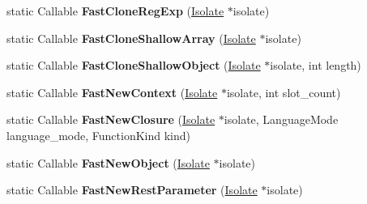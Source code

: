 \begin{DoxyCompactItemize}
\item 
static Callable {\bfseries Fast\+Clone\+Reg\+Exp} (\hyperlink{classv8_1_1internal_1_1_isolate}{Isolate} $\ast$isolate)\hypertarget{classv8_1_1internal_1_1_code_factory_abb0f3b75868ab982ca38a454ef3c063e}{}\label{classv8_1_1internal_1_1_code_factory_abb0f3b75868ab982ca38a454ef3c063e}

\item 
static Callable {\bfseries Fast\+Clone\+Shallow\+Array} (\hyperlink{classv8_1_1internal_1_1_isolate}{Isolate} $\ast$isolate)\hypertarget{classv8_1_1internal_1_1_code_factory_acde8fe33e3e1253ef8acead38d71269f}{}\label{classv8_1_1internal_1_1_code_factory_acde8fe33e3e1253ef8acead38d71269f}

\item 
static Callable {\bfseries Fast\+Clone\+Shallow\+Object} (\hyperlink{classv8_1_1internal_1_1_isolate}{Isolate} $\ast$isolate, int length)\hypertarget{classv8_1_1internal_1_1_code_factory_a516d9a31eea79d55426795e2956b748c}{}\label{classv8_1_1internal_1_1_code_factory_a516d9a31eea79d55426795e2956b748c}

\item 
static Callable {\bfseries Fast\+New\+Context} (\hyperlink{classv8_1_1internal_1_1_isolate}{Isolate} $\ast$isolate, int slot\+\_\+count)\hypertarget{classv8_1_1internal_1_1_code_factory_af67b1ab39ea507be8f6116774e2a3b2d}{}\label{classv8_1_1internal_1_1_code_factory_af67b1ab39ea507be8f6116774e2a3b2d}

\item 
static Callable {\bfseries Fast\+New\+Closure} (\hyperlink{classv8_1_1internal_1_1_isolate}{Isolate} $\ast$isolate, Language\+Mode language\+\_\+mode, Function\+Kind kind)\hypertarget{classv8_1_1internal_1_1_code_factory_a07c5cb0a438a9be9fbb55a0056fc74b1}{}\label{classv8_1_1internal_1_1_code_factory_a07c5cb0a438a9be9fbb55a0056fc74b1}

\item 
static Callable {\bfseries Fast\+New\+Object} (\hyperlink{classv8_1_1internal_1_1_isolate}{Isolate} $\ast$isolate)\hypertarget{classv8_1_1internal_1_1_code_factory_a0495ae221c4228938c778ae37b8711a0}{}\label{classv8_1_1internal_1_1_code_factory_a0495ae221c4228938c778ae37b8711a0}

\item 
static Callable {\bfseries Fast\+New\+Rest\+Parameter} (\hyperlink{classv8_1_1internal_1_1_isolate}{Isolate} $\ast$isolate)\hypertarget{classv8_1_1internal_1_1_code_factory_aa7cebd4dd911511b730dc16b0fab0e14}{}\label{classv8_1_1internal_1_1_code_factory_aa7cebd4dd911511b730dc16b0fab0e14}


\end{DoxyCompactItemize}
